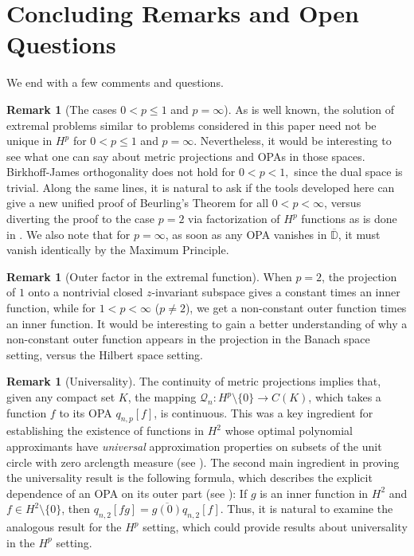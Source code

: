 \documentclass{article}
\theoremstyle{plain}
\numberwithin{Theorem}{section}
\numberwithin{equation}{section}
\theoremstyle{plain}
\theoremstyle{definition}
\newtheorem{Remark}[Theorem]{Remark}
\renewcommand{\leq}{\leqslant}
\newcommand{\D}{\mathbb{D}}
\begin{document}
\fi














\section{Concluding Remarks and Open Questions}\label{concl}
We end with a few comments and questions. 

\begin{Remark}[The cases $0< p \le 1$ and $p=\infty$]
As is well known, the solution of extremal problems similar to problems considered in this paper need not be unique in $H^p$ for $0 < p \leq 1$ and $p = \infty$.  Nevertheless, it would be interesting to see what one can say about metric projections and OPAs in those spaces. Birkhoff-James orthogonality does not hold for $0 < p < 1,$ since the dual space is trivial. Along the same lines, it is natural to ask if the tools developed here can give a new unified proof of Beurling's Theorem for all $0 < p < \infty$, versus diverting the proof to the case $p = 2$ via factorization of $H^p$ functions as is done in \cite[p. 98]{MR628971}.
We also note that for $p = \infty$, as soon as any OPA vanishes in $\overline{\D}$, it must vanish identically by the Maximum Principle.
\end{Remark}


\begin{Remark}[Outer factor in the extremal function]
When $p = 2$, the projection of $1$ onto a nontrivial closed $z$-invariant subspace gives a constant times an inner function, while for $1 < p < \infty$ ($p \neq 2$), we get a non-constant outer function times an inner function. It would be interesting to gain a better understanding of why a non-constant outer function appears in the projection in the Banach space setting, versus the Hilbert space setting. 
\end{Remark}


\begin{Remark}[Universality]
The continuity of metric projections implies that, given any compact set $K$, the mapping $\mathcal{Q}_n \colon  H^p\setminus\{0\} \to C(K)$, which takes a function $f$ to its OPA $q_{n,p}[f]$, is continuous. This was a key ingredient for establishing the existence of functions in $H^2$ whose optimal polynomial approximants have \textit{universal} approximation properties on subsets of the unit circle with zero arclength measure (see \cite[Proposition~2.1]{BIMS}). The second main ingredient in proving the universality result is the following formula, which describes the explicit dependence of an OPA on its outer part (see \cite[Proposition~2.2]{BIMS}): 
If $g$ is an inner function in $H^2$ and $f\in H^2\setminus\{0\}$, then $q_{n,2}[fg]=\overline{g(0)} q_{n,2}[f]$. Thus, it is natural to examine the analogous result for the $H^p$ setting, which could provide results about universality in the $H^p$ setting.
\end{Remark}
\end{document}
